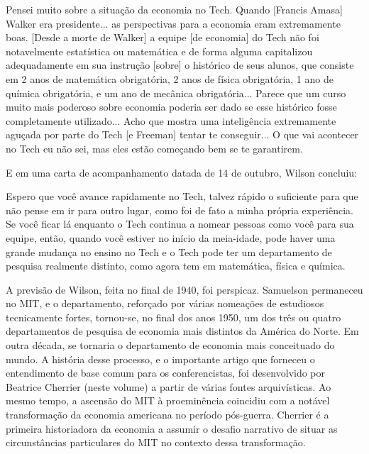 \documentclass[12pt]{article}
\begin{document}
Pensei muito sobre a situação da economia no Tech. Quando [Francis Amasa] Walker era presidente... as perspectivas para a economia eram extremamente boas. [Desde a morte de Walker] a equipe [de economia] do Tech não foi notavelmente estatística ou matemática e de forma alguma capitalizou adequadamente em sua instrução [sobre] o histórico de seus alunos, que consiste em 2 anos de matemática obrigatória, 2 anos de física obrigatória, 1 ano de química obrigatória, e um ano de mecânica obrigatória... Parece que um curso muito mais poderoso sobre economia poderia ser dado se esse histórico fosse completamente utilizado... Acho que mostra uma inteligência extremamente aguçada por parte do Tech [e Freeman] tentar te conseguir... O que vai acontecer no Tech eu não sei, mas eles estão começando bem se te garantirem.

E em uma carta de acompanhamento datada de 14 de outubro, Wilson concluiu:

Espero que você avance rapidamente no Tech, talvez rápido o suficiente para que não pense em ir para outro lugar, como foi de fato a minha própria experiência. Se você ficar lá enquanto o Tech continua a nomear pessoas como você para sua equipe, então, quando você estiver no início da meia-idade, pode haver uma grande mudança no ensino no Tech e o Tech pode ter um departamento de pesquisa realmente distinto, como agora tem em matemática, física e química.

A previsão de Wilson, feita no final de 1940, foi perspicaz. Samuelson permaneceu no MIT, e o departamento, reforçado por várias nomeações de estudiosos tecnicamente fortes, tornou-se, no final dos anos 1950, um dos três ou quatro departamentos de pesquisa de economia mais distintos da América do Norte. Em outra década, se tornaria o departamento de economia mais conceituado do mundo. A história desse processo, e o importante artigo que forneceu o entendimento de base comum para os conferencistas, foi desenvolvido por Beatrice Cherrier (neste volume) a partir de várias fontes arquivísticas. Ao mesmo tempo, a ascensão do MIT à proeminência coincidiu com a notável transformação da economia americana no período pós-guerra. Cherrier é a primeira historiadora da economia a assumir o desafio narrativo de situar as circunstâncias particulares do MIT no contexto dessa transformação.
\end{document}
